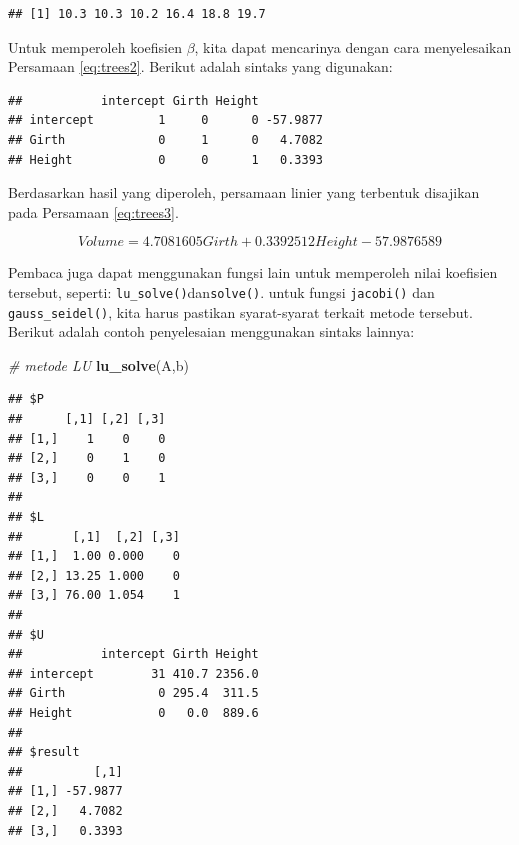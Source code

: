 \documentclass[]{book}
\newenvironment{Shaded}{\begin{snugshade}}{\end{snugshade}}
\newcommand{\CommentTok}[1]{\textcolor[rgb]{0.56,0.35,0.01}{\textit{#1}}}
\newcommand{\KeywordTok}[1]{\textcolor[rgb]{0.13,0.29,0.53}{\textbf{#1}}}
\newcommand{\NormalTok}[1]{#1}
\newcommand{\OperatorTok}[1]{\textcolor[rgb]{0.81,0.36,0.00}{\textbf{#1}}}
\newcommand{\StringTok}[1]{\textcolor[rgb]{0.31,0.60,0.02}{#1}}
\theoremstyle{definition}
\theoremstyle{definition}
\theoremstyle{definition}
\theoremstyle{remark}
\begin{document}
\begin{verbatim}
## [1] 10.3 10.3 10.2 16.4 18.8 19.7
\end{verbatim}

Untuk memperoleh koefisien \(\beta\), kita dapat mencarinya dengan cara menyelesaikan Persamaan \eqref{eq:trees2}. Berikut adalah sintaks yang digunakan:

\begin{Shaded}
\end{Shaded}

\begin{verbatim}
##           intercept Girth Height         
## intercept         1     0      0 -57.9877
## Girth             0     1      0   4.7082
## Height            0     0      1   0.3393
\end{verbatim}

Berdasarkan hasil yang diperoleh, persamaan linier yang terbentuk disajikan pada Persamaan \eqref{eq:trees3}.

\begin{equation}
Volume=4.7081605 Girth + 0.3392512 Height  -57.9876589
 \label{eq:trees3}
\end{equation}

Pembaca juga dapat menggunakan fungsi lain untuk memperoleh nilai koefisien tersebut, seperti: \texttt{lu\_solve()}dan\texttt{solve()}. untuk fungsi \texttt{jacobi()} dan \texttt{gauss\_seidel()}, kita harus pastikan syarat-syarat terkait metode tersebut. Berikut adalah contoh penyelesaian menggunakan sintaks lainnya:

\begin{Shaded}
\begin{Highlighting}[]
\CommentTok{# metode LU}
\KeywordTok{lu_solve}\NormalTok{(A,b)}
\end{Highlighting}
\end{Shaded}

\begin{verbatim}
## $P
##      [,1] [,2] [,3]
## [1,]    1    0    0
## [2,]    0    1    0
## [3,]    0    0    1
## 
## $L
##       [,1]  [,2] [,3]
## [1,]  1.00 0.000    0
## [2,] 13.25 1.000    0
## [3,] 76.00 1.054    1
## 
## $U
##           intercept Girth Height
## intercept        31 410.7 2356.0
## Girth             0 295.4  311.5
## Height            0   0.0  889.6
## 
## $result
##          [,1]
## [1,] -57.9877
## [2,]   4.7082
## [3,]   0.3393
\end{verbatim}
\end{document}
